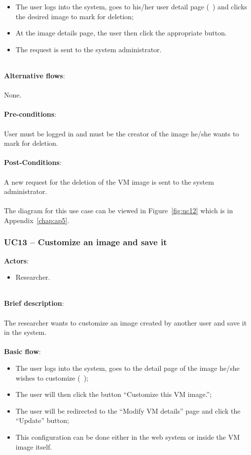 \begin{itemize}
\item The user logs into the system, goes to his/her user detail page (~) and clicks the desired image to mark for deletion;
\item At the image details page, the user then click the appropriate button.
\item The request is sent to the system administrator.
\end{itemize}

\ \\
\textbf{Alternative flows}:\\
\ \\
None.\\
\ \\
\textbf{Pre-conditions}:\\
\ \\
User must be logged in and must be the creator of the image he/she wants to mark for deletion.\\
\ \\
\textbf{Post-Conditions}:\\
\ \\
A new request for the deletion of the VM image is sent to the system administrator.\\
\ \\
The diagram for this use case can be viewed in Figure~\ref{fig:uc12} which is in Appendix~\ref{chap:ap5}.

\subsubsection{UC13 -- Customize an image and save it}\label{uc13}

\textbf{Actors}:

\begin{itemize}
\item Researcher.
\end{itemize}

\ \\
\textbf{Brief description}:\\
\ \\
The researcher wants to customize an image created by another user and save it in the system.\\
\ \\
\textbf{Basic flow}:

\begin{itemize}
\item The user logs into the system, goes to the detail page of the image he/she wishes to customize (~);
\item The user will then click the button ``Customize this VM image.'';
\item The user will be redirected to the ``Modify VM details'' page and click the ``Update'' button;
\item This configuration can be done either in the web system or inside the VM image itself.
\end{itemize}

